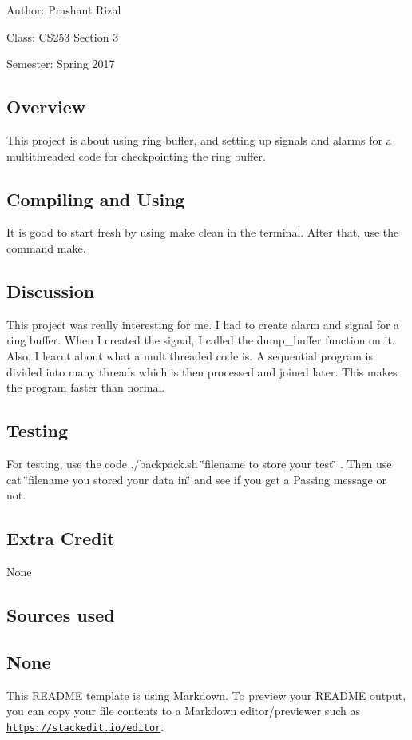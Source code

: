 
\begin{DoxyItemize}
\item Author\-: Prashant Rizal
\item Class\-: C\-S253 Section 3
\item Semester\-: Spring 2017
\end{DoxyItemize}

\subsection*{Overview}

This project is about using ring buffer, and setting up signals and alarms for a multithreaded code for checkpointing the ring buffer.

\subsection*{Compiling and Using}

It is good to start fresh by using make clean in the terminal. After that, use the command make.

\subsection*{Discussion}

This project was really interesting for me. I had to create alarm and signal for a ring buffer. When I created the signal, I called the dump\-\_\-buffer function on it. Also, I learnt about what a multithreaded code is. A sequential program is divided into many threads which is then processed and joined later. This makes the program faster than normal.

\subsection*{Testing}

For testing, use the code ./backpack.sh \char`\"{}filename to store your test\char`\"{} . Then use cat \char`\"{}filename
you stored your data in\char`\"{} and see if you get a Passing message or not.

\subsection*{Extra Credit}

None

\subsection*{Sources used}

\subsection*{None }

This R\-E\-A\-D\-M\-E template is using Markdown. To preview your R\-E\-A\-D\-M\-E output, you can copy your file contents to a Markdown editor/previewer such as \href{https://stackedit.io/editor}{\tt https\-://stackedit.\-io/editor}. 